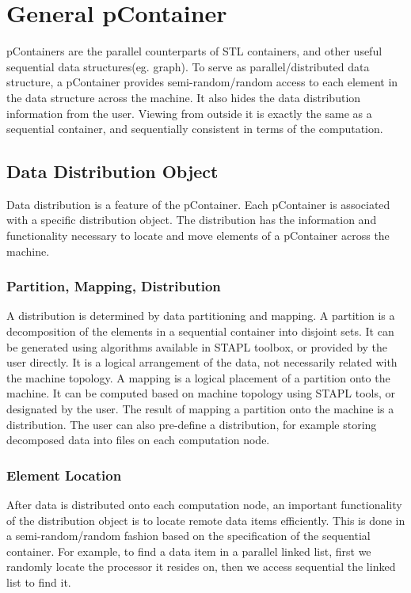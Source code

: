 \documentclass[12pt,epsfig]{article}
\begin{document}
\pagestyle{plain}

\title{}
\thispagestyle{plain}


\section{General pContainer}

pContainers are the parallel counterparts of STL containers, and other
useful sequential data structures(eg. graph). To serve as
parallel/distributed data structure, a pContainer provides
semi-random/random access to each element in the data structure across
the machine. It also hides the data distribution information from the
user. Viewing from outside it is exactly the same as a sequential
container, and sequentially consistent in terms of the computation.

\subsection{Data Distribution Object}
Data distribution is a feature of the pContainer. Each pContainer
is associated with a specific distribution object. The distribution
has the information and functionality necessary to locate and move
elements of a pContainer across the machine.

\subsubsection{Partition, Mapping, Distribution}
A distribution is determined by data partitioning and mapping. A
partition is a decomposition of the elements in a sequential container
into disjoint sets. It can be generated using algorithms available in
STAPL toolbox, or provided by the user directly. It is a logical
arrangement of the data, not necessarily related with the machine
topology. A mapping is a logical placement of a partition onto the
machine. It can be computed based on machine topology using STAPL
tools, or designated by the user. The result of mapping a partition
onto the machine is a distribution. The user can also pre-define a
distribution, for example storing decomposed data into files on each
computation node.


\subsubsection{Element Location}
After data is distributed onto each computation node, an important
functionality of the distribution object is to locate remote data
items efficiently. This is done in a semi-random/random fashion based
on the specification of the sequential container. For example, to find
a data item in a parallel linked list, first we randomly locate the
processor it resides on, then we access sequential the linked list to
find it.
\end{document}
